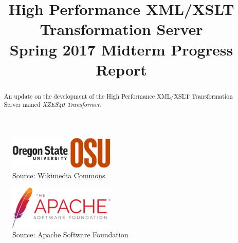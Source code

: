 

\title{
	High Performance XML/XSLT Transformation Server \\
    {
    	\LARGE Spring 2017 Midterm Progress Report 
    }
}
\author{
}



\maketitle
\begin{abstract}
  An update on the development of the High Performance XML/XSLT Transformation Server named \textit{XZES40 Transformer}.
\end{abstract}

\begin{figure}[h]
  \begin{centering}
    \includegraphics[width=0.45\textwidth]{figures/osu-logo}
    \caption{Source: Wikimedia Commons \cite{osu-logo}}
  \end{centering}
\end{figure}

\begin{figure}[h]
  \begin{centering}
    \includegraphics[width=0.45\textwidth]{figures/asf-logo}
    \caption{Source: Apache Software Foundation \cite{asf-logo}}
  \end{centering}
\end{figure}

\clearpage

